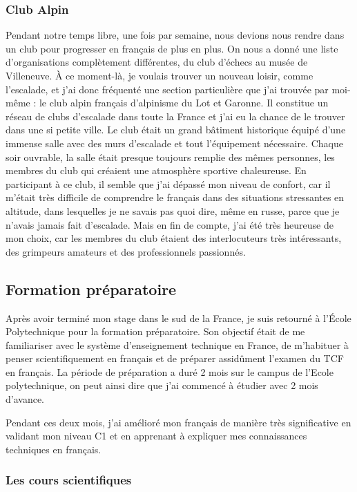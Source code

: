 \documentclass[a4paper,12pt]{article}
\begin{document}
\subsubsection{Club Alpin}

Pendant notre temps libre, une fois par semaine, nous devions nous rendre dans un club pour progresser en français de plus en plus. On nous a donné une liste d'organisations complètement différentes, du club d'échecs au musée de Villeneuve. À ce moment-là, je voulais trouver un nouveau loisir, comme l'escalade, et j'ai donc fréquenté une section particulière que j'ai trouvée par moi-même : le club alpin français d'alpinisme du Lot et Garonne. Il constitue un réseau de clubs d'escalade dans toute la France et j'ai eu la chance de le trouver dans une si petite ville. Le club était un grand bâtiment historique équipé d'une immense salle avec des murs d'escalade et tout l'équipement nécessaire. Chaque soir ouvrable, la salle était presque toujours remplie des mêmes personnes, les membres du club qui créaient une atmosphère sportive chaleureuse. En participant à ce club, il semble que j'ai dépassé mon niveau de confort, car il m'était très difficile de comprendre le français dans des situations stressantes en altitude, dans lesquelles je ne savais pas quoi dire, même en russe, parce que je n'avais jamais fait d'escalade. Mais en fin de compte, j'ai été très heureuse de mon choix, car les membres du club étaient des interlocuteurs très intéressants, des grimpeurs amateurs et des professionnels passionnés.


%	
\subsection{Formation préparatoire}

Après avoir terminé mon stage dans le sud de la France, je suis retourné à l'École Polytechnique pour la formation préparatoire. Son objectif était de me familiariser avec le système d'enseignement technique en France, de m'habituer à penser scientifiquement en français et de préparer assidûment l'examen du TCF en français. La période de préparation a duré 2 mois sur le campus de l'Ecole polytechnique, on peut ainsi dire que j'ai commencé à étudier avec 2 mois d'avance. 

Pendant ces deux mois, j'ai amélioré mon français de manière très significative en validant mon niveau C1 et en apprenant à expliquer mes connaissances techniques en français.
 
\subsubsection{Les cours scientifiques}
\end{document}
